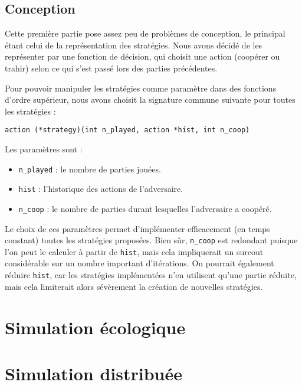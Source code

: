 \documentclass[10pt]{article}
\begin{document}
\subsection{Conception}
Cette première partie pose assez peu de problèmes de conception, 
le principal étant celui de la représentation des stratégies.
Nous avons décidé de les représenter par une fonction de décision, qui choisit une action
(coopérer ou trahir) selon ce qui s'est passé lors des parties précédentes.

Pour pouvoir manipuler les stratégies comme paramètre dans des fonctions d'ordre supérieur, 
nous avons choisit la signature commune suivante pour toutes les stratégies :
\begin{verbatim}
action (*strategy)(int n_played, action *hist, int n_coop)
\end{verbatim}

Les paramètres sont :
\begin{itemize}
\item \verb|n_played| : le nombre de parties jouées.
\item \verb|hist| : l'historique des actions de l'adversaire.
\item \verb|n_coop| : le nombre de parties durant lesquelles l'adversaire a coopéré.
\end{itemize}
Le choix de ces paramètres permet d'implémenter efficacement (en temps constant)
toutes les stratégies proposées. Bien sûr, \verb|n_coop| est redondant puisque
l'on peut le calculer à partir de \verb|hist|, mais cela impliquerait un surcout
considérable sur un nombre important d'itérations.
On pourrait également réduire \verb|hist|, car les stratégies implémentées n'en
utilisent qu'une partie réduite, mais cela limiterait alors sévèrement la
création de nouvelles stratégies.

\section{Simulation écologique}

\section{Simulation distribuée}
\end{document}
